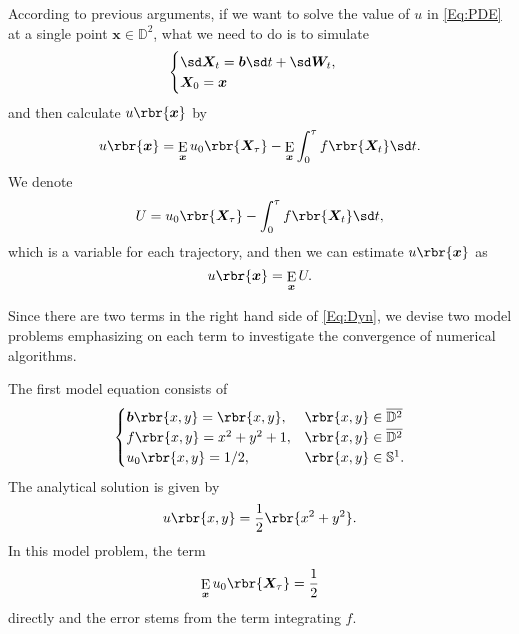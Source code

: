 \documentclass[english, nochinese]{pnote}
\DeclareMathOperator\ope{\mathrm{E}}
\begin{document}
According to previous arguments, if we want to solve the value of $u$ in \eqref{Eq:PDE} at a single point $ \bm{x} \in \mathbb{D}^2 $, what we need to do is to simulate
\begin{equation} \label{Eq:SDE}
\begin{cases}
\sd \bm{X}_t = \bm{b} \sd t + \sd \bm{W}_t, \\
\bm{X}_0 = \bm{x}
\end{cases}
\end{equation}
and then calculate $ u \rbr{\bm{x}} $ by
\begin{equation} \label{Eq:Dyn}
u \rbr{\bm{x}} = \ope_{\bm{x}} u_0 \rbr{\bm{X}_{\tau}} - \ope_{\bm{x}} \int_0^{\tau} f \rbr{\bm{X}_t} \sd t.
\end{equation}
We denote
\begin{equation}
U = u_0 \rbr{\bm{X}_{\tau}} - \int_0^{\tau} f \rbr{\bm{X}_t} \sd t,
\end{equation}
which is a variable for each trajectory, and then we can estimate $ u \rbr{\bm{x}} $ as
\begin{equation}
u \rbr{\bm{x}} = \ope_{\bm{x}} U.
\end{equation}

Since there are two terms in the right hand side of \eqref{Eq:Dyn}, we devise two model problems emphasizing on each term to investigate the convergence of numerical algorithms.

The first model equation consists of
\begin{equation} \label{Eq:Prob1}
\begin{cases}
\bm{b} \rbr{ x, y } = \rbr{ x, y }, & \rbr{ x, y } \in \overline{\mathbb{D}^2} \\
f \rbr{ x, y } = x^2 + y^2 + 1, & \rbr{ x, y } \in \overline{\mathbb{D}^2} \\
u_0 \rbr{ x, y } = 1 / 2, & \rbr{ x, y } \in \mathbb{S}^1.
\end{cases}
\end{equation}
The analytical solution is given by
\begin{equation}
u \rbr{ x, y } = \frac{1}{2} \rbr{ x^2 + y^2 }.
\end{equation}
In this model problem, the term
\begin{equation}
\ope_{\bm{x}} u_0 \rbr{\bm{X}_{\tau}} = \frac{1}{2}
\end{equation}
directly and the error stems from the term integrating $f$.
\end{document}
